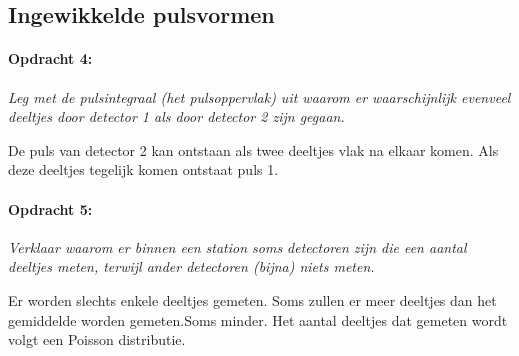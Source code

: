 \subsection{Ingewikkelde pulsvormen}

\begin{minipage}[t]{1\columnwidth}%

\paragraph{Opdracht 4:}

\textit{Leg met de pulsintegraal (het pulsoppervlak) uit waarom er
waarschijnlijk evenveel deeltjes door detector 1 als door detector
2 zijn gegaan.}

%
De puls van detector 2 kan ontstaan als twee deeltjes vlak na elkaar
komen. Als deze deeltjes tegelijk komen ontstaat puls 1.%
%
\end{minipage}

\begin{minipage}[t]{1\columnwidth}%

\paragraph{Opdracht 5:}

\textit{Verklaar waarom er binnen een station soms detectoren zijn
die een aantal deeltjes meten, terwijl ander detectoren (bijna) niets
meten.}

%
Er worden slechts enkele deeltjes gemeten. Soms zullen er meer deeltjes
dan het gemiddelde worden gemeten.Soms minder. Het aantal deeltjes
dat gemeten wordt volgt een Poisson distributie.%
%
\end{minipage}

